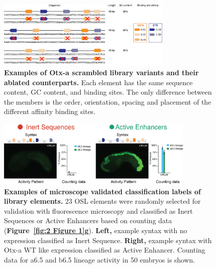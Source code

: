 \begin{figure}[p]
    \centering
    \includegraphics[width=0.75\textwidth]{2_figures-and-files/SuppFig2.png}
    \caption[Examples of Otx-a scrambled library variants and their ablated counterparts.]{\textbf{Examples of Otx-a scrambled library variants and their ablated counterparts.} Each element has the same sequence content, GC content, and binding sites. The only difference between the members is the order, orientation, spacing and placement of the different affinity binding sites.}
    \label{fig:supplementary_2}
\end{figure}

\begin{figure}[p]
    \centering
    \includegraphics[width=0.85\textwidth]{2_figures-and-files/SuppFig3.png}
    \caption[Examples of microscope validated classification labels of library elements.]{\textbf{Examples of microscope validated classification labels of library elements.} 23 OSL elements were randomly selected for validation with fluorescence microscopy and classified as Inert Sequences or Active Enhancers based on counting data (\textbf{Figure~\ref{fig:2 Figure 1}g}). \textbf{Left,} example syntax with no expression classified as Inert Sequence. \textbf{Right,} example syntax with Otx-a WT like expression classified as Active Enhancer. Counting data for a6.5 and b6.5 lineage activity in 50 embryos is shown.}
    \label{fig:supplementary_3}
\end{figure}

